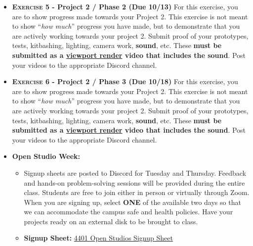 \def\dMon{3/8}%
\def\dTues{3/9}%
\def\dWed{3/10}%
\def\dThur{3/11}%
\placeDate


\def\tues{10/13}%
\def\thur{10/15}%
\def\sunday{10/18}%
% 
\begin{itemize}[noitemsep,topsep=0pt,leftmargin=*]
    \item \textbf{\textsc{Exercise 5} - Project 2 / Phase 2 (Due \tues)} For this exercise, you are to show progress made towards your Project 2. This exercise is not meant to show ``\emph{how much}'' progress you have made, but to demonstrate that you are actively working towards your project 2. Submit proof of your prototypes, tests, kitbashing, lighting, camera work, \textbf{sound}, etc. These \textbf{must be submitted as a \href{https://docs.blender.org/manual/en/latest/editors/3dview/viewport_render.html}{viewport render} video that includes the sound}. Post your videos to the appropriate Discord channel.
    \item \textbf{\textsc{Exercise 6} - Project 2 / Phase 3 (Due \sunday)} For this exercise, you are to show progress made towards your Project 2. This exercise is not meant to show ``\emph{how much}'' progress you have made, but to demonstrate that you are actively working towards your project 2. Submit proof of your prototypes, tests, kitbashing, lighting, camera work, \textbf{sound}, etc. These \textbf{must be submitted as a \href{https://docs.blender.org/manual/en/latest/editors/3dview/viewport_render.html}{viewport render} video that includes the sound}. Post your videos to the appropriate Discord channel.
    \item \textcolor{defaultColor}{\textbf{Open Studio Week:}}
    \begin{itemize}
              \item Signup sheets are posted to Discord for Tuesday and Thursday. Feedback and hands-on problem-solving sessions will be provided during the entire class. Students are free to join either in person or virtually through Zoom. When you are signing up, select \textbf{ONE} of the available two days so that we can accommodate the campus safe and health policies.  Have your projects ready on an external disk to be brought to class.
              \item \textbf{Signup Sheet:} \href{https://docs.google.com/spreadsheets/d/1ipdRdrNSbPkMpchORybS6Fx0hvsXnFQzyQ64Ml3oH3A/edit?usp=sharing}{4401 Open Studios Signup Sheet}
          \end{itemize}
\end{itemize}